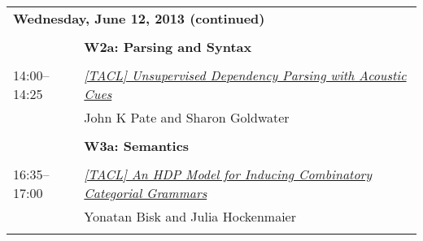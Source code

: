 \newpage
\begin{tabular}{p{20mm}p{138mm}}
\\
\multicolumn{2}{l}{\bf Wednesday, June 12, 2013 (continued)} \\\\
 & {\bf W2a: Parsing and Syntax} \\
\\
14:00--14:25 & \hyperlink{page.41}{\em [TACL] Unsupervised Dependency Parsing with Acoustic Cues}\\
         & John K Pate and Sharon Goldwater \\
\\

 & {\bf W3a: Semantics} \\
\\
16:35--17:00 & \hyperlink{page.53}{\em [TACL] An HDP Model for Inducing Combinatory Categorial Grammars}\\
         & Yonatan Bisk and Julia Hockenmaier \\
\\



\end{tabular}
